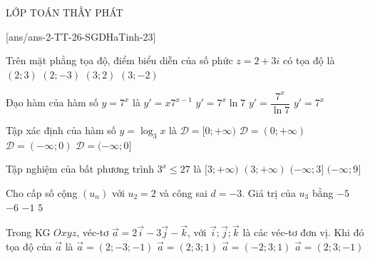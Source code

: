 \begin{name}
	{\tenchude}{\tendethi}{LỚP TOÁN THẦY PHÁT}{\thoigian}
\end{name}
\setcounter{ex}{0}
[ans/ans-2-TT-26-SGDHaTinh-23]

\begin{ex}%
	Trên mặt phẳng tọa độ, điểm biểu diễn của số phức $z=2+3i$ có tọa độ là
	\choice
	{\True $(2;3)$}
	{$(2;-3)$}
	{$(3;2)$}
	{$(3;-2)$}
\end{ex}

\begin{ex}%
	Đạo hàm của hàm số $y=7^x$ là
	\choice
	{$y'=x7^{x-1}$}
	{\True $y'=7^x\ln 7$}
	{$y'=\dfrac{7^x}{\ln 7}$}
	{$y'=7^x$}
\end{ex}

\begin{ex}%
	Tập xác định của hàm số $y=\log_3x$ là
	\choice
	{$\mathscr{D}=[0;+\infty)$}
	{\True $\mathscr{D}=(0;+\infty)$}
	{$\mathscr{D}=(-\infty;0)$}
	{$\mathscr{D}=(-\infty;0]$}
\end{ex}

\begin{ex}%
	Tập nghiệm của bất phương trình $3^x \leq 27$ là
	\choice
	{$[3;+\infty)$}
	{$(3;+\infty)$}
	{\True $(-\infty;3]$}
	{$(-\infty;9]$}
\end{ex}

\begin{ex}%
	Cho cấp số cộng $(u_n)$ với $u_2=2$ và công sai $d=-3$. Giá trị của $u_3$ bằng
	\choice
	{$-5$}
	{$-6$}
	{\True $-1$}
	{$5$}
\end{ex}

\begin{ex}%
	Trong KG $Oxyz$, véc-tơ $\overrightarrow{a}=2\overrightarrow{i}-3\overrightarrow{j}-\overrightarrow{k}$, với $\overrightarrow{i};\overrightarrow{j};\overrightarrow{k}$ là các véc-tơ đơn vị. Khi đó tọa độ của $\overrightarrow{a}$ là
	\choice
	{\True $\overrightarrow{a}=(2;-3;-1)$}
	{$\overrightarrow{a}=(2;3;1)$}
	{$\overrightarrow{a}=(-2;3;1)$}
	{$\overrightarrow{a}=(2;3;-1)$}
\end{ex}

